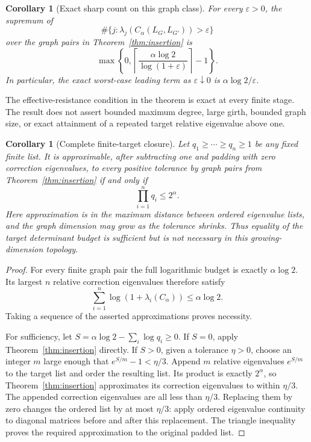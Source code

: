 \documentclass[11pt]{article}
\newtheorem{corollary}[theorem]{Corollary}
\begin{document}
\begin{corollary}[Exact sharp count on this graph class]
\label{cor:count}
For every $\varepsilon>0$, the supremum of
\[
 \#\{j:\lambda_j(C_\alpha(L_G,L_{G'}))>\varepsilon\}
\]
over the graph pairs in Theorem~\ref{thm:insertion} is
\[
 \max\left\{0,\left\lceil
      \frac{\alpha\log2}{\log(1+\varepsilon)}
                         \right\rceil-1\right\}.
\]
In particular, the exact worst-case leading term as
$\varepsilon\downarrow0$ is $\alpha\log2/\varepsilon$.
\end{corollary}

The effective-resistance condition in the theorem is exact at every
finite stage. The result does not assert bounded maximum degree, large
girth, bounded graph size, or exact attainment of a repeated target
relative eigenvalue above one.

\begin{corollary}[Complete finite-target closure]\label{cor:closure}
Let $q_1\ge\cdots\ge q_n\ge1$ be any fixed finite list. It is
approximable, after subtracting one and padding with zero correction
eigenvalues, to every positive tolerance by graph pairs from
Theorem~\ref{thm:insertion} if and only if
\[
 \prod_{i=1}^n q_i\le2^\alpha.
\]
Here approximation is in the maximum distance between ordered
eigenvalue lists, and the graph dimension may grow as the tolerance
shrinks. Thus equality of the target determinant budget is sufficient
but is not necessary in this growing-dimension topology.
\end{corollary}
\begin{proof}
For every finite graph pair the full logarithmic budget is exactly
$\alpha\log2$. Its largest $n$ relative correction eigenvalues
therefore satisfy
\[
 \sum_{i=1}^n\log(1+\lambda_i(C_\alpha))\le\alpha\log2.
\]
Taking a sequence of the asserted approximations proves necessity.

For sufficiency, let
$S=\alpha\log2-\sum_i\log q_i\ge0$.
If $S=0$, apply Theorem~\ref{thm:insertion} directly.
If $S>0$, given a tolerance $\eta>0$, choose an integer $m$ large
enough that $e^{S/m}-1<\eta/3$. Append $m$ relative eigenvalues
$e^{S/m}$ to the target list and order the resulting list.
Its product is exactly $2^\alpha$, so Theorem~\ref{thm:insertion}
approximates its correction eigenvalues to within $\eta/3$.
The appended correction eigenvalues are all less than $\eta/3$.
Replacing them by zero changes the ordered list by at most $\eta/3$:
apply ordered eigenvalue continuity to diagonal matrices before and
after this replacement. The triangle inequality proves the required
approximation to the original padded list.
\end{proof}
\end{document}
